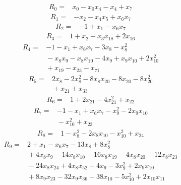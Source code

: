 {\small
\setlength{\jot}{2pt}
\allowdisplaybreaks[2]
\begin{align*}
R_{0} ={}& x_{0} - x_{0} x_{4} - x_{4} + x_{7}
\end{align*}
\begin{align*}
R_{1} ={}& -x_{2} - x_{4} x_{5} + x_{6} x_{7}
\end{align*}
\begin{align*}
R_{2} ={}& -1 + x_{1} - x_{6} x_{7}
\end{align*}
\begin{align*}
R_{3} ={}& 1 + x_{2} - x_{3} x_{18} + 2x_{16}
\end{align*}
\begin{align*}
R_{4} ={}& -1 - x_{1} + x_{6} x_{7} - 3x_{8} - x_{8}^{2} \\
&{}  - x_{8} x_{9} - x_{8} x_{10} - 4x_{9} + x_{9} x_{10} + 2x_{10}^{2} \\
&{}  + x_{19} - x_{23} - x_{71}
\end{align*}
\begin{align*}
R_{5} ={}& 2x_{8} - 2x_{8}^{2} - 8x_{8} x_{20} - 8x_{20} - 8x_{20}^{2} \\
&{}  + x_{21} + x_{33}
\end{align*}
\begin{align*}
R_{6} ={}& 1 + 2x_{21} - 4x_{21}^{2} + x_{22}
\end{align*}
\begin{align*}
R_{7} ={}& -1 - x_{1} + x_{6} x_{7} - x_{9}^{2} - 2x_{9} x_{10} \\
&{}  - x_{10}^{2} + x_{23}
\end{align*}
\begin{align*}
R_{8} ={}& 1 - x_{8}^{2} - 2x_{8} x_{10} - x_{10}^{2} + x_{24}
\end{align*}
\begin{align*}
R_{9} ={}& 2 + x_{1} - x_{6} x_{7} - 13x_{8} + 8x_{8}^{2} \\
&{}  + 4x_{8} x_{9} - 14x_{8} x_{10} - 16x_{8} x_{19} - 4x_{8} x_{20} - 12x_{8} x_{23} \\
&{}  - 24x_{8} x_{24} + 4x_{8} x_{52} + 4x_{9} - 3x_{9}^{2} + 2x_{9} x_{10} \\
&{}  + 8x_{9} x_{23} - 32x_{9} x_{36} - 38x_{10} - 5x_{10}^{2} + 2x_{10} x_{11} \\

\end{align*}}

